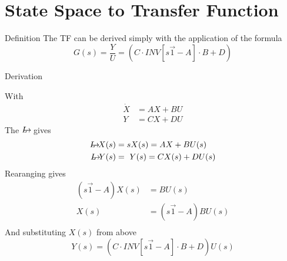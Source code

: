 \documentclass{../templates/topic}
\begin{document}
\chapter{State Space to Transfer Function}

\begin{section}{Definition}
	The TF can be derived simply with the application of the formula
	\begin{equation}
		G(s)=\frac{Y}{U}=(C\cdot INV[s\vec{1}-A]\cdot B+D)
	\end{equation}
\end{section}

\begin{section}{Derivation}
	
	With
	\begin{align}
		\dot{X}&=AX+BU\\
		Y&=CX+DU
	\end{align}
	The $\laplace$ gives
	\begin{align}
		\laplace{X}(s)&=sX(s)=AX+BU(s)\\
		\laplace{Y}(s)&=\ Y(s)=CX(s)+DU(s)
	\end{align}
	Rearanging gives
	\begin{align}
		(s\vec{1}-A)X(s)&=BU(s)\\
		X(s)&=(s\vec{1}-A)BU(s)\\
	\end{align}
	And substituting $X(s)$ from above
	\begin{equation}
		Y(s)=(C\cdot INV[s\vec{1}-A]\cdot B+D)U(s)
	\end{equation}
\end{section}
\end{document}
